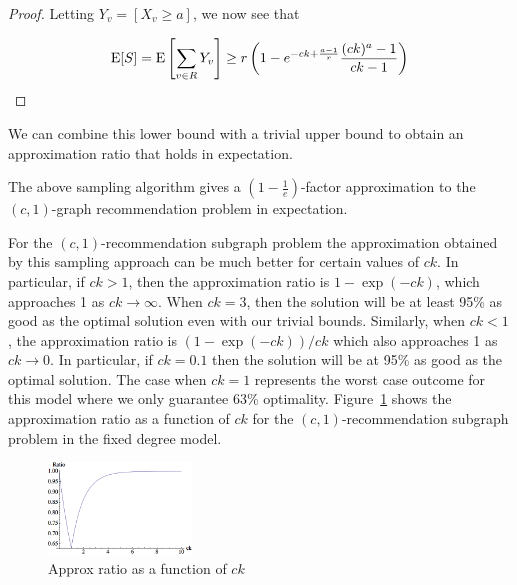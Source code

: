 \begin{proof}
Letting $Y_v = \left[X_v \geq a\right]$, we now see that

\[ \text{E}[S] = \text{E}\left[\sum_{v\in R} Y_v\right] \geq r\left(1-e^{-ck+\frac{a-1}{r}} \frac{(ck)^a-1}{ck-1}\right) \]
\end{proof} \vspace{-.2cm}

We can combine this lower bound with a trivial upper bound to obtain an
approximation ratio that holds in expectation.

\begin{thm}
The above sampling algorithm gives a $\left(1-\frac1e\right)$-factor approximation to the $(c,1)$-graph recommendation problem in expectation.
\end{thm}


For the $(c, 1)$-recommendation subgraph problem the approximation obtained by this
sampling approach can be much better for certain values of $ck$. In particular,
if $ck>1$, then the approximation ratio is $1-\exp(-ck)$, which
approaches 1 as $ck\to\infty$. When $ck=3$, then the
solution will be at least 95\% as good as the optimal solution even
with our trivial bounds. Similarly, when $ck<1$, the approximation
ratio is $(1-\exp(-ck))/ck$ which also approaches 1 as $ck\to 0$. In
particular, if $ck=0.1$ then the solution will be at 95\% as good as
the optimal solution. The case when $ck=1$ represents the
worst case outcome for this model where we only guarantee 63\%
optimality. Figure~\ref{fig:simple_approx} shows the approximation ratio as a
function of $ck$ for the $(c,1)$-recommendation subgraph problem in the fixed degree model.\vs

\begin{figure}[H]
  \centering
  \includegraphics[width=0.34\textwidth]{images/sri_Original.png}
  \caption{Approx ratio as a function of $ck$ }\label{fig:simple_approx}
\end{figure}

